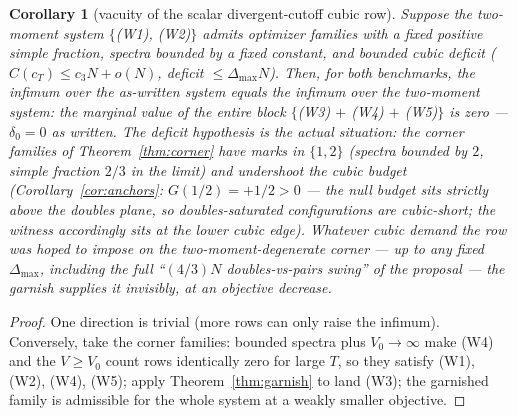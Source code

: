 \documentclass[11pt]{article}
\theoremstyle{plain}
\newtheorem{corollary}[theorem]{Corollary}
\theoremstyle{definition}
\theoremstyle{remark}
\begin{document}
\begin{corollary}[vacuity of the scalar divergent-cutoff cubic row]
\label{cor:vacuity}
Suppose the two-moment system $\{$(W1), (W2)$\}$ admits optimizer families with a
fixed positive simple fraction, spectra bounded by a fixed constant, and bounded
cubic deficit ($C(c_T) \le c_3 N + o(N)$, deficit $\le \Delta_{\max} N$). Then,
for both benchmarks, the infimum over the as-written system equals the infimum
over the two-moment system: the marginal value of the entire block
$\{$(W3) $+$ (W4) $+$ (W5)$\}$ is zero --- $\delta_0 = 0$ as written. The deficit
hypothesis is the actual situation: the corner families of
Theorem~\ref{thm:corner} have marks in $\{1, 2\}$ (spectra bounded by $2$, simple
fraction $2/3$ in the limit) and undershoot the cubic budget
(Corollary~\ref{cor:anchors}: $G(1/2) = +1/2 > 0$ --- the null budget sits
strictly above the doubles plane, so doubles-saturated configurations are
cubic-short; the witness accordingly sits at the lower cubic edge).
Whatever cubic demand the row was hoped to impose on the two-moment-degenerate
corner --- up to any fixed $\Delta_{\max}$, including the full ``$(4/3)N$
doubles-vs-pairs swing'' of the proposal --- the garnish supplies it invisibly,
at an objective decrease.
\end{corollary}

\begin{proof}
One direction is trivial (more rows can only raise the infimum). Conversely, take
the corner families: bounded spectra plus $V_0 \to \infty$ make (W4) and the
$V \ge V_0$ count rows identically zero for large $T$, so they satisfy (W1),
(W2), (W4), (W5); apply Theorem~\ref{thm:garnish} to land (W3); the garnished
family is admissible for the whole system at a weakly smaller objective.
\end{proof}
\end{document}
